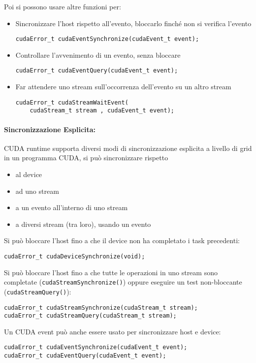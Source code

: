 Poi si possono usare altre funzioni per:
\begin{itemize}
	\item Sincronizzare l'host rispetto all'evento, bloccarlo finché non si verifica l'evento
	\begin{verbatim}
cudaError_t cudaEventSynchronize(cudaEvent_t event);
	\end{verbatim}
	
	\item Controllare l'avvenimento di un evento, senza bloccare
	\begin{verbatim}
cudaError_t cudaEventQuery(cudaEvent_t event);
	\end{verbatim}
	
	\item Far attendere uno stream sull'occorrenza dell'evento su un altro stream
	\begin{verbatim}
cudaError_t cudaStreamWaitEvent(
    cudaStream_t stream , cudaEvent_t event);
	\end{verbatim}
\end{itemize}

\paragraph{Sincronizzazione Esplicita:} CUDA runtime supporta diversi modi di sincronizzazione esplicita a livello di grid in un programma CUDA, si può sincronizzare rispetto
\begin{itemize}
	\item al device
	
	\item ad uno stream
	
	\item a un evento all'interno di uno stream
	
	\item a diversi stream (tra loro), usando un evento
\end{itemize}

Si può bloccare l'host fino a che il device non ha completato i task precedenti:
\begin{verbatim}
cudaError_t cudaDeviceSynchronize(void);
\end{verbatim}

Si può bloccare l'host fino a che tutte le operazioni in uno stream sono completate (\texttt{cudaStreamSynchronize()}) oppure eseguire un test non-bloccante (\texttt{cudaStreamQuery()}):
\begin{verbatim}
cudaError_t cudaStreamSynchronize(cudaStream_t stream);
cudaError_t cudaStreamQuery(cudaStream_t stream);
\end{verbatim}

Un CUDA event può anche essere usato per sincronizzare host e device:
\begin{verbatim}
cudaError_t cudaEventSynchronize(cudaEvent_t event);
cudaError_t cudaEventQuery(cudaEvent_t event);
\end{verbatim}

